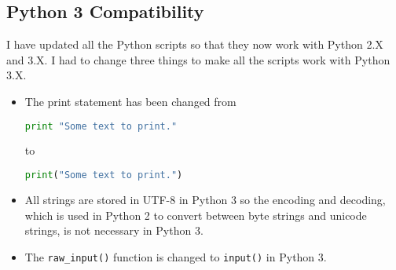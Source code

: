 \subsection{Python 3 Compatibility}
\label{task:20140901_jkn0}
I have updated all the Python scripts so that they now work with Python 2.X and 3.X. I had to change three things to make all the scripts work with Python 3.X.
\begin{itemize}
    \item The print statement has been changed from
\begin{lstlisting}[language=python]
print "Some text to print."
\end{lstlisting}
to
\begin{lstlisting}[language=python]
print("Some text to print.")
\end{lstlisting}
    \item All strings are stored in UTF-8 in Python 3 so the encoding and decoding, which is used in Python 2 to convert between byte strings and unicode strings, is not necessary in Python 3.
    \item The {\tt raw\_input()} function is changed to {\tt input()} in Python 3. 
\end{itemize}
